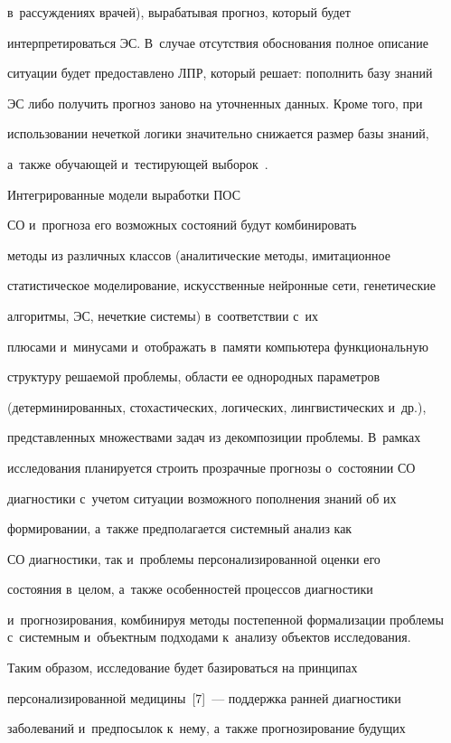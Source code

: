 в~рассуждениях врачей), вырабатывая прогноз, который будет 

интерпретироваться ЭС. В~случае отсутствия обоснования полное описание 

ситуации будет предоставлено ЛПР, который решает: пополнить базу знаний 

ЭС либо получить прогноз заново на уточненных данных. Кроме того, при 

использовании нечеткой логики значительно снижается размер базы знаний, 

а~также обучающей и~тестирующей выборок~\cite{6-rum}.

  

  Интегрированные модели выработки ПОС

СО и~прогноза его возможных состояний будут комбинировать 

методы из различных классов (аналитические методы, имитационное 

статистическое моделирование, искусственные нейронные сети, генетические 

алгоритмы, ЭС, нечеткие системы) в~соответствии с~их 

плюсами и~минусами и~отображать в~памяти компьютера функциональную 

структуру решаемой проблемы, области ее однородных параметров 

(детерминированных, стохастических, логических, лингвистических и~др.), 

представленных множествами задач из декомпозиции проблемы. В~рамках 

исследования планируется строить прозрачные прогнозы о~состоянии СО

 диагностики с~учетом ситуации возможного пополнения знаний об их 

формировании, а~также предполагается системный анализ как 

СО диагностики, так и~проб\-ле\-мы персонализированной оценки его 

состояния в~целом, а~также особенностей процессов диагностики 

и~прогнозирования, комбинируя методы постепенной формализации проблемы с~системным и~объектным подходами к~анализу объектов исследования.

  

  Таким образом, исследование будет базироваться на принципах 

персонализированной медицины~[7]~--- поддержка ранней диагностики 

заболеваний и~предпосылок к~нему, а~также прогнозирование будущих 

